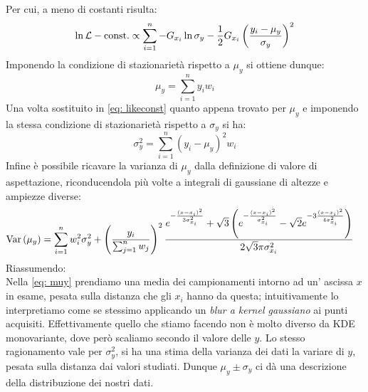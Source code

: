 \documentclass{article}[a4paper, oneside, 11pt]
\begin{document}
Per cui, a meno di costanti risulta:
\begin{equation}\label{eq: likeconst}
	\ln{\mathcal L} - \text{const.} \propto \sum_{i=1}^{n} -G_{x_i} \ln{\sigma_y}
	- \frac{1}{2} G_{x_i} \left( \frac{y_i - \mu_y}{\sigma_y} \right)^2
\end{equation}
Imponendo la condizione di stazionarietà rispetto a $\mu_y$ si ottiene dunque:
\begin{equation}\label{eq: muy}
	\mu_y = \sum_{i=1}^{n} y_i w_i 
\end{equation} 
Una volta sostituito in \eqref{eq: likeconst} quanto appena trovato per $\mu_y$
e imponendo la stessa condizione di stazionarietà rispetto a $\sigma_y$ si ha:
\begin{equation}\label{eq: sigmay}
	\sigma_y^2 = \sum_{i=1}^{n} (y_i - \mu_y)^2 w_i
\end{equation}
Infine è possibile ricavare la varianza di $\mu_y$ dalla definizione di valore
di aspettazione, riconducendola più volte a integrali di gaussiane di altezze
e ampiezze diverse:
\begin{align} \label{aln: varmuy}
	\text{Var}\left(\mu_y\right) &= \sum_{i=1}^{n} w_i^2 \sigma_y^2 + 
	\left(\frac{y_i}{\sum_{j=1}^{n} w_j} \right)^2 \frac{
	e^{-\frac{(x-x_i)^2}{3 \sigma_{x_i}^2}} +  
	\sqrt{3} \left( e^{-\frac{(x-x_i)^2}{\sigma_{x_i}^2}} -
	\sqrt{2} e^{-3 \frac{(x-x_i)^2}{4 \sigma_{x_i}^2}} \right)
	} {2 \sqrt{3}\pi \sigma_{x_i}^2} 
\end{align}
Riassumendo:\\
Nella \eqref{eq: muy} prendiamo una media dei campionamenti intorno ad un'
ascissa $x$ in esame, pesata sulla distanza che gli $x_i$ hanno da questa; 
intuitivamente lo interpretiamo come se stessimo applicando un 
\emph{blur a kernel gaussiano} ai punti acquisiti.
Effettivamente quello che stiamo facendo non è molto diverso da KDE monovariante, dove però scaliamo secondo il valore delle $y$.
Lo stesso ragionamento vale per $\sigma_y^2$, si ha una stima della varianza
dei dati la variare di $y$, pesata sulla distanza dai valori studiati. Dunque
$\mu_y \pm \sigma_y$ ci dà una descrizione della distribuzione dei nostri dati.
\end{document}

